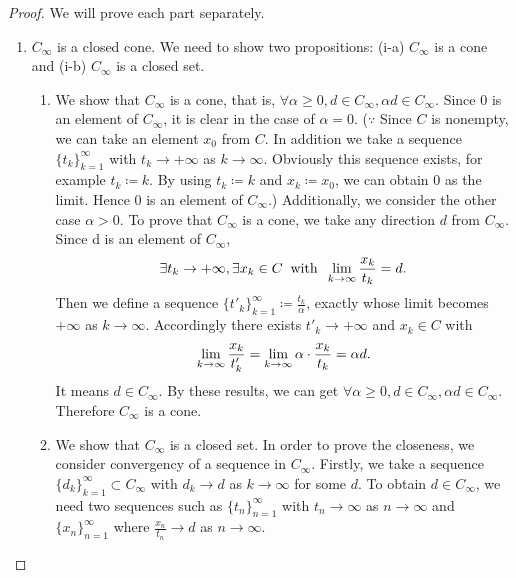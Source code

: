 \documentclass[a4paper,11pt, oneside]{book}
\theoremstyle{definition}
\begin{document}
\begin{proof}
  We will prove each part separately.
  \begin{enumerate}[label=\roman*,align=CenterWithParen]
    \item $C_{\infty}$ is a closed cone.
      We need to show two propositions: (i-a) $C_{\infty}$ is a cone and (i-b) $C_{\infty}$ is a closed set.
      \begin{enumerate}[label=i-\alph*,align=CenterWithParen]
        \item We show that $C_{\infty}$ is a cone, that is, $\forall \alpha \geq 0, d \in C_{\infty}, \alpha d \in C_{\infty}$. Since $0$ is an element of $C_{\infty}$, it is clear in the case of $\alpha = 0$.
        ($\because$ Since $C$ is nonempty, we can take an element $x_0$ from $C$. In addition we take a sequence $\{t_k\}_{k=1}^{\infty}$ with $t_k \rightarrow + \infty$ as $k \rightarrow \infty$. Obviously this sequence exists, for example $t_k \coloneqq k$. By using $t_k \coloneqq k$ and $x_k \coloneqq x_0$, we can obtain $0$ as the limit. Hence $0$ is an element of $C_{\infty}$.)
        Additionally, we consider the other case $\alpha > 0$. To prove that $C_{\infty}$ is a cone, we take any direction $d$ from $C_{\infty}$. Since d is an element of $C_{\infty}$,
        \begin{equation}
          \exists t_k \rightarrow + \infty , \exists x_k \in C \:\text{ with }\: \lim_{k \to \infty} \frac{x_k}{t_k} = d. \notag
        \end{equation}
        Then we define a sequence $\{t'_k\}_{k=1}^{\infty} \coloneqq \frac{t_k}{\alpha}$, exactly whose limit becomes $+\infty$ as $k \rightarrow \infty$. Accordingly there exists $t'_k \rightarrow + \infty$ and $x_k \in C$ with
        \begin{equation}
          \lim_{k \to \infty} \frac{x_k}{t'_k} = \lim_{k \to \infty} \alpha \cdot \frac{x_k}{t_k} = \alpha d. \notag
        \end{equation}
        It means $d \in C_{\infty}$. By these results, we can get $\forall \alpha \geq 0, d \in C_{\infty}, \alpha d \in C_{\infty}$. Therefore $C_{\infty}$ is a cone.

        \item We show that $C_{\infty}$ is a closed set. In order to prove the closeness, we consider convergency of a sequence in $C_{\infty}$. Firstly, we take a sequence $\{d_k\}_{k=1}^{\infty} \subset C_{\infty}$ with $d_k \rightarrow d$ as $k \rightarrow \infty$ for some $d$. To obtain $d \in C_{\infty}$, we need two sequences such as $\{t_n\}_{n=1}^{\infty}$ with $t_n \rightarrow \infty$ as $n \rightarrow \infty$ and $\{x_n\}_{n=1}^{\infty}$ where $\frac{x_n}{t_n} \rightarrow d$ as $n \rightarrow \infty$.


\end{enumerate}
\end{enumerate}
\end{proof}
\end{document}
